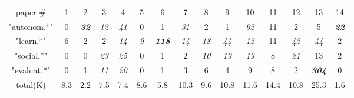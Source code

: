 {\centering \setlength{\tabcolsep}{3pt} \footnotesize
\begin{tabular}{ccccccccccccccc}
paper \#
&1
&2
&3
&4
&5
&6
&7
&8
&9
&10
&11
&12
&13
&14
\\
\cline{2-15}
"autonom.*"
&0
&\textbf{\emph{32}}
&\emph{12}
&\emph{41}
&0
&1
&\emph{31}
&2
&1
&\emph{92}
&11
&2
&5
&\textbf{\emph{22}}
\\
"learn.*"
&6
&2
&2
&\emph{14}
&\emph{9}
&\textbf{\emph{118}}
&\emph{14}
&\emph{18}
&\emph{44}
&\emph{12}
&11
&\emph{42}
&\emph{44}
&2
\\
"social.*"
&0
&0
&\emph{23}
&\emph{25}
&0
&1
&2
&\emph{10}
&\emph{19}
&\emph{19}
&8
&\emph{21}
&13
&2
\\
"evaluat.*"
&0
&1
&\emph{11}
&\emph{20}
&0
&1
&3
&6
&4
&9
&8
&2
&\textbf{\emph{304}}
&0
\\
\cline{2-15}
total(K)
& 8.3  %
& 2.2  %
& 7.5  %
& 7.4  %
& 8.6  %
& 5.8  %
&10.3 %
& 9.6  %
&10.8 %
&11.6 %
&14.4 %
&10.8 %
&25.3 %
& 1.6  %
\\
\end{tabular}
}
